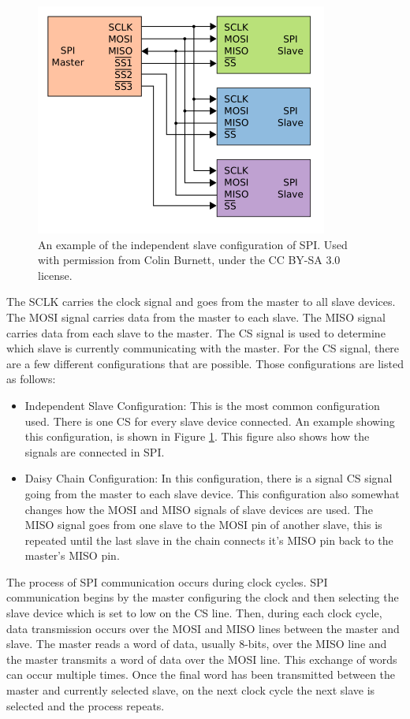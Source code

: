 \begin{figure}
    \centering
    \includegraphics[scale=0.5]{figures/spi-three-slaves.png}
    \caption{An example of the independent slave configuration of SPI. Used with permission from Colin Burnett, under the CC BY-SA 3.0 license.}
    \label{spi-three-slaves}
\end{figure}

The SCLK carries the clock signal and goes from the master to all slave devices. The MOSI signal carries data from the master to each slave. The MISO signal carries data from each slave to the master. The CS signal is used to determine which slave is currently communicating with the master. For the CS signal, there are a few different configurations that are possible. Those configurations are listed as follows:
\begin{itemize}
    \item Independent Slave Configuration: This is the most common configuration used. There is one CS for every slave device connected. An example showing this configuration, is shown in Figure \ref{spi-three-slaves}. This figure also shows how the signals are connected in SPI.
    \item Daisy Chain Configuration: In this configuration, there is a signal CS signal going from the master to each slave device. This configuration also somewhat changes how the MOSI and MISO signals of slave devices are used. The MISO signal goes from one slave to the MOSI pin of another slave, this is repeated until the last slave in the chain connects it's MISO pin back to the master's MISO pin.
\end{itemize}

The process of SPI communication occurs during clock cycles. SPI communication begins by the master configuring the clock and then selecting the slave device which is set to low on the CS line. Then, during each clock cycle, data transmission occurs over the MOSI and MISO lines between the master and slave. The master reads a word of data, usually 8-bits, over the MISO line and the master transmits a word of data over the MOSI line. This exchange of words can occur multiple times. Once the final word has been transmitted between the master and currently selected slave, on the next clock cycle the next slave is selected and the process repeats.

